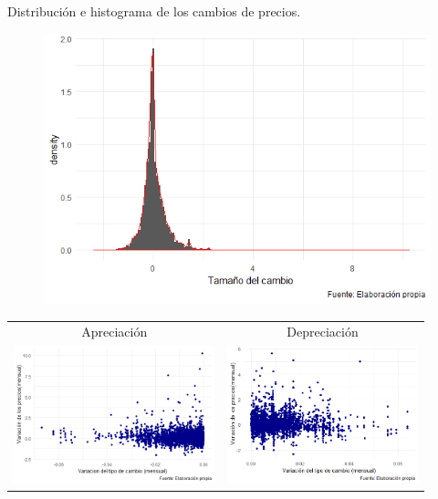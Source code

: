 \documentclass[xcolor=dvipsnames]{beamer}
\begin{document}
\begin{frame}
Distribuci\'on e histograma de los cambios de precios.
\begin{figure}
\includegraphics[scale=0.50]{cambios_precios_duraciones.png}
\end{figure}
\end{frame}


\begin{frame}
\begin{table}[h]
\begin{tabular}{cc}
Apreciaci\'on & Depreciaci\'on \\
\includegraphics[height=3.99cm, scale = 1.0]{apreciacion.png} &
\includegraphics[height=3.99cm, scale =1.0]{depreciacion.png} \\
\end{tabular}
\end{table}
\end{frame}
\end{document}
